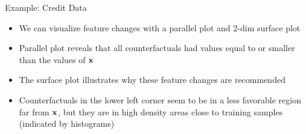 \documentclass[11pt,compress,t,notes=noshow, aspectratio=169, xcolor=table]{beamer}
\begin{document}
\begin{frame}{Example: Credit Data }
\begin{itemize}
	\item<1-> We can visualize feature changes with a parallel plot and 2-dim surface plot
		\item<1-> Parallel plot reveals that all counterfactuals had values equal to or smaller than the values of $\xv$
		\item<2-> The surface plot illustrates why these feature changes are recommended 
		\item<2-> Counterfactuals in the lower left corner seem to be in a less favorable region far from $\xv$, but they are in high density areas close to training samples (indicated by histograms)
	\end{itemize}
	\begin{columns}
\end{columns}
\end{frame}
\end{document}

